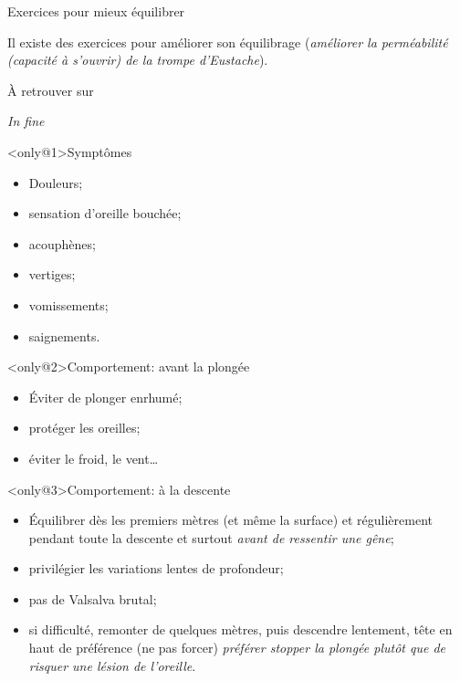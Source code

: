 \begin{frame}{Exercices pour mieux équilibrer}

Il existe des exercices pour améliorer son équilibrage (\og \textsl{améliorer la perméabilité
(capacité à s'ouvrir) de la trompe d'Eustache}\fg).

À retrouver sur 
\end{frame}

\begin{frame}{\textit{In fine}}
\begin{minipage}[c][\frameheight]{0.65\textwidth}
\begin{block}<only@1>{Symptômes}
\begin{itemize}
\item Douleurs;
\item sensation d'oreille bouchée;
\item acouphènes;
\item vertiges;
\item vomissements;
\item saignements.
\end{itemize}
\end{block}%
\begin{exampleblock}<only@2>{Comportement: avant la plongée}
\begin{itemize}
\item Éviter de plonger enrhumé;
\item protéger les oreilles;
\item éviter le froid, le vent\dots
\end{itemize}
\end{exampleblock}%
\begin{exampleblock}<only@3>{Comportement: à la descente}
\begin{itemize}
\item Équilibrer dès les premiers mètres (et même la surface) et régulièrement
  pendant toute la descente et surtout \emph{avant de ressentir une gêne};
\item privilégier les variations lentes de profondeur;
\item pas de Valsalva brutal;
\item si difficulté, remonter de quelques mètres, puis descendre lentement,
  tête en haut de préférence (ne pas forcer) \emph{préférer stopper la plongée
  plutôt que de risquer une lésion de l'oreille}.
\end{itemize}
\end{exampleblock}%

\end{minipage}
\end{frame}
